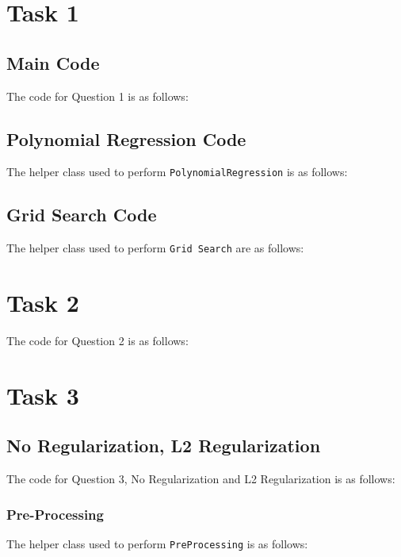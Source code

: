 \documentclass[12pt,a4paper]{article}
\def\tt#1{\texttt{#1}}
\begin{document}
{\hypersetup{linkcolor=black}
 \tableofcontents}
\break

\section{Task 1}
\subsection{Main Code}
The code for Question 1 is as follows:\vspace{-1em}


\subsection{Polynomial Regression Code}
The helper class used to perform \tt{PolynomialRegression} is as follows: \vspace{-1em}


\subsection{Grid Search Code}
The helper class used to perform \tt{Grid Search} are as follows:\vspace{-1em}


\section{Task 2}
The code for Question 2 is as follows:\vspace{-1em}



\section{Task 3}
\subsection{No Regularization, L2 Regularization}
The code for Question 3, No Regularization and L2 Regularization is as follows:\vspace{-1em}


\subsubsection{Pre-Processing}
The helper class used to perform \tt{PreProcessing} is as follows: \vspace{-1em}

\end{document}
